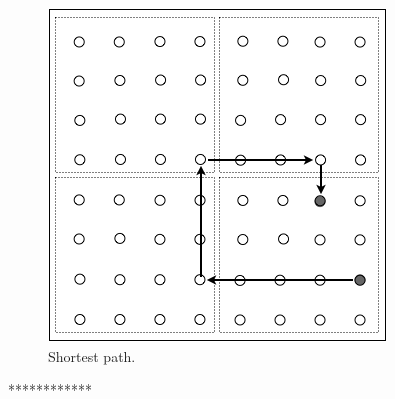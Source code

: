 \begin{itemize}
{\begin{figure}[hbt]
\begin{center}
       \includegraphics[scale=0.4]{FiguresGraph/routingCity3}
       \caption{Shortest path.}
\end{center}
\end{figure}
************}

\end{itemize}



